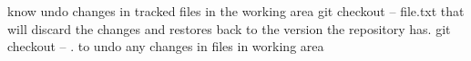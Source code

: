 know undo changes in tracked files in the working area 
  git checkout -- file.txt
  that will discard the changes and restores back to the version the repository has.
  git checkout -- .   to undo any changes in files in working area 
